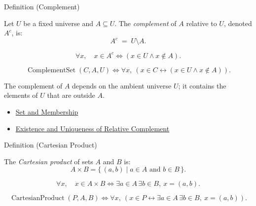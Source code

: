 \begin{definitionbox}{Definition (Complement)}
\begin{definition}[Complement]\label{def:complement}
Let $U$ be a fixed universe and $A \subseteq U$. The \emph{complement} of $A$
relative to $U$, denoted $A^c$, is:
\[
A^c \;=\; U \setminus A.
\]
\end{definition}
\end{definitionbox}

\begin{remark*}
\[
  \forall x,\quad x\in A^c \iff (x\in U\wedge x\notin A).
\]
\end{remark*}

\begin{remark*}
\[
  \operatorname{ComplementSet}(C,A,U)
  \iff
  \forall x,\ (x\in C \leftrightarrow (x\in U\wedge x\notin A)).
\]
\end{remark*}

\begin{remark*}[Interpretation]
The complement of $A$ depends on the ambient universe $U$; it contains the
elements of $U$ that are outside $A$.
\end{remark*}

\begin{dependencies}
\begin{itemize}
  \item \hyperref[def:set-membership]{Set and Membership}
  \item \hyperref[cor:relative-complement-exists-unique]{Existence and Uniqueness of Relative Complement}
\end{itemize}
\end{dependencies}

\begin{definitionbox}{Definition (Cartesian Product)}
\begin{definition}\label{def:cartesian-product}
The \emph{Cartesian product} of sets $A$ and $B$ is:
\[
A \times B = \{\, (a,b) \mid a \in A \text{ and } b \in B \,\}.
\]
\end{definition}
\end{definitionbox}

\begin{remark*}
\[
  \forall x,\quad x\in A\times B
  \iff
  \exists a\in A\,\exists b\in B,\ x=(a,b).
\]
\end{remark*}

\begin{remark*}
\[
  \operatorname{CartesianProduct}(P,A,B)
  \iff
  \forall x,\ (x\in P\leftrightarrow \exists a\in A\,\exists b\in B,\ x=(a,b)).
\]
\end{remark*}

